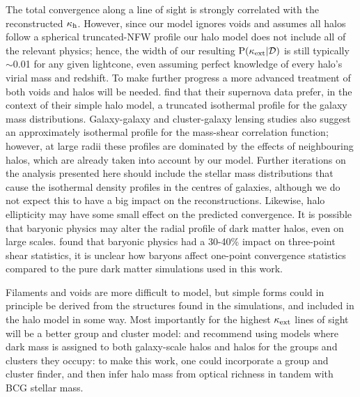 \documentclass[useAMS,usenatbib,a4paper]{mn2e}
\begin{document}

The total convergence along a line of sight is strongly correlated with the
reconstructed $\kappa_{\rm h}$. However, since our model ignores voids and assumes
all halos follow a spherical truncated-NFW profile our halo model does not
include all of the relevant physics; hence, the width of our resulting
${\rm P}(\kappa_{\rm ext}|{\mathcal{D}})$ is still typically $\sim$0.01 for any given lightcone,
even assuming perfect knowledge of every halo's virial mass and redshift. To
make further progress a more advanced treatment of both voids and halos will
be needed. \citet{KarpenkaEtal2012} find that their supernova data prefer, in
the context of their simple halo model, a truncated isothermal profile for the
galaxy mass distributions. Galaxy-galaxy and cluster-galaxy  lensing studies
\citep[\eg][]{GavazziEtal2007,JohnstonEtal2007} also suggest an approximately
isothermal profile for the mass-shear correlation function; however, at large
radii these profiles are dominated by the effects of neighbouring halos, which
are already taken into account by our model.  Further iterations on the
analysis presented here should include the stellar mass distributions that
cause the isothermal density profiles in the centres of galaxies, although we
do not expect this to have a big impact on the reconstructions. Likewise, 
halo ellipticity may have some small effect on the predicted convergence. It
is possible that baryonic physics may alter    the radial profile of dark
matter halos, even on large scales. \citet{Semboloni+2012} found that baryonic
physics had a 30-40\% impact on three-point shear statistics, it is unclear
how baryons affect one-point convergence statistics compared to the pure dark
matter simulations used in this work.

Filaments and voids are more difficult to model, but simple forms could in
principle be derived from the structures found in the simulations, and
included in the halo model in some way. Most importantly for the highest
$\kappa_{\rm ext}$ lines of sight will be a better group and cluster model:
\citet{MomchevaEtal2006} and  \citet{WongEtal2011} recommend using models
where dark mass is assigned to both galaxy-scale halos and halos for the
groups and clusters they occupy: to make this work, one could incorporate a
group and cluster finder, and then infer halo mass from optical richness
\citep[\eg][]{MaxBCG} in tandem with BCG stellar mass.
\end{document}
